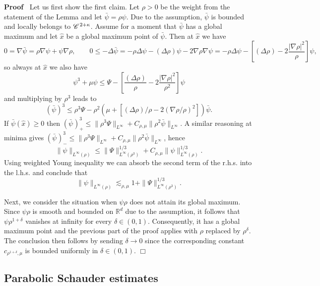 \documentclass[a4paper,11pt]{article}
\renewcommand{\geq}{\geqslant}
\newenvironment{proof}{\noindent\textbf{Proof\ }}{\hspace*{\fill}$\Box$\medskip}
\numberwithin{equation}{section}
\newcommand{\CC}{\mathscr{C} \hspace{.1em}}
\newcommand{\R}{\mathbb{R}}
\newcommand{\8}{\infty}
\begin{document}
\begin{proof}
Let us first show the first claim.  Let $\rho > 0$ be the weight from the statement of the Lemma and let $\bar{\psi} = \rho \psi$. Due to the assumption, $\bar{\psi}$ is bounded and locally belongs  to $\CC^{2+\kappa}$. 
  Assume for a moment that $\bar{\psi}$ has a global maximum and let $\hat{x}$
  be a global maximum point of $\bar{\psi}$. Then at $\hat{x}$ we have
  \[ 0 = \nabla \bar{\psi} = \rho \nabla \psi + \psi \nabla \rho, \qquad 0
     \leqslant - \Delta \bar{\psi} = - \rho \Delta \psi - (\Delta \rho) \psi -
     2 \nabla \rho \nabla \psi = - \rho \Delta \psi - \left[ (\Delta \rho) - 2
     \frac{| \nabla \rho |^2}{\rho} \right] \psi, \]
  so always at $\hat{x}$ we also have
  \begin{equation*}%
   \psi^3 + \mu \psi \leqslant \Psi - \left[ \frac{(\Delta \rho)}{\rho} - 2
     \frac{| \nabla \rho |^2}{\rho^2} \right] \psi 
  \end{equation*}
and  multiplying by $\rho^3$ leads to
  \[ (\bar{\psi})^3 \leqslant \rho^3 \Psi - \rho^2 (\mu + [(\Delta \rho) /
     \rho - 2 (\nabla \rho / \rho)^2]) \bar{\psi}. \]
If $\bar{\psi}(\hat{ x})\geq 0$     then
  $(\bar{\psi}^{})_+^3 \leqslant \| \rho^3 \Psi
  \|_{L^{\infty}} + C_{\rho,\mu} \| \rho^2 \bar{\psi} \|_{L^{\infty}}$. A similar
  reasoning at minima gives  $(\bar{\psi}^{})_-^3 \leqslant \| \rho^3 \Psi
  \|_{L^{\infty}} + C_{\rho,\mu} \| \rho^2 \bar{\psi} \|_{L^{\infty}}$, hence
  \[ \| \psi \|_{L^{\infty} (\rho)} \leqslant \| \Psi \|_{L^{\infty}
     (\rho^3)}^{1 / 3} + C_{\rho,\mu} \| \psi \|_{L^{\infty} (\rho)}^{1 / 3} .
  \]
Using weighted Young inequality we can absorb the second term of the r.h.s. into the l.h.s. and conclude that
  \[ \| \psi \|_{L^{\infty} (\rho)} \lesssim_{\rho,\mu} 1 + \| \Psi \|_{L^{\infty}
     (\rho^3)}^{1 / 3} . \]

Next, we consider the situation when $\psi\rho$ does not attain its global maximum. Since $\psi\rho$ is smooth and  bounded on $\R^{d}$ due to the assumption, it follows that  $\psi\rho^{1+\delta}$ vanishes at infinity for every $\delta\in (0,1)$. Consequently, it has a global maximum point and the previous part of the proof applies with $\rho$ replaced by $\rho^{\delta}$. The conclusion then follows by sending $\delta\to 0$ since the corresponding constant $c_{\rho^{1+\delta},\mu}$ is bounded uniformly in $\delta\in (0,1).$
%
%
\end{proof}



\subsection{Parabolic Schauder estimates}
\end{document}
